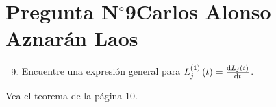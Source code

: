 \section{Pregunta N$^{\circ}$9\qquad Carlos Alonso Aznarán Laos}

\begin{frame}
    \begin{enumerate}\setcounter{enumi}{8}
        \item

              Encuentre una expresión general para
              \begin{math}
                  L_{j}^{\left(1\right)}\left(t\right)=
                  \diff{L_{j}\left(t\right)}{t}
              \end{math}.
    \end{enumerate}

    \begin{solution}
        Vea el teorema de la página 10.
    \end{solution}
\end{frame}